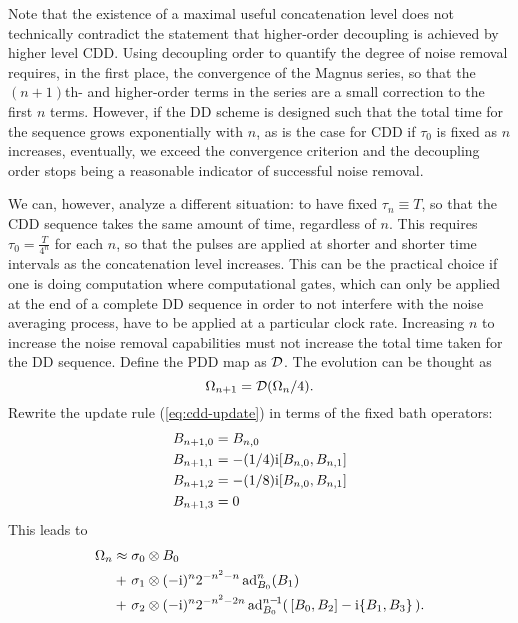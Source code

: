 \documentclass[pra,reprint,superscriptaddress]{revtex4-2}
\begin{document}
Note that the existence of a maximal useful concatenation level does not technically contradict the statement that 
higher-order decoupling is achieved by higher level CDD. Using decoupling order to quantify the degree of noise removal requires, in the first place, the convergence of the Magnus series, so that the $(n+1)$th- and higher-order terms in the series are a small correction to the first $n$ terms. However, if the DD scheme is designed such that the total time for the sequence grows exponentially with $n$, as is the case for CDD if $\tau_0$ is fixed as $n$ increases, eventually, we exceed the convergence criterion and the decoupling order stops being a reasonable indicator of successful noise removal. 

We can, however, analyze a different situation: to have fixed $\tau_n\equiv T$, so that the CDD sequence takes the same amount of time, regardless of $n$. This requires $\tau_0=\frac{T}{4^n}$ for each $n$, so that the pulses are applied at shorter and shorter time intervals as the concatenation level increases. This can be the practical choice if one is doing computation where computational gates, which can only be applied at the end of a complete DD sequence in order to not interfere with the noise averaging process, have to be applied at a particular clock rate. Increasing $n$ to increase the noise removal capabilities must not increase the total time taken for the DD sequence.
Define the PDD map as $\mathcal{D}$.
The evolution can be thought as 
\begin{equation}
 \Omega_{n+1} = \mathcal{D}(\Omega_{n}/4).
\end{equation}
Rewrite the update rule (\ref{eq:cdd-update}) in terms of the fixed bath operators:
\begin{equation}\label{eq:cdd-update2}
\begin{aligned}
 B_{n+1,0} &= B_{n,0}\\
B_{n+1,1} & = -(1/4)\mathrm{i} [B_{n,0}, B_{n,1} ]\\
 B_{n+1,2} & = -(1/8)\mathrm{i} [B_{n,0}, B_{n,1} ]\\
  B_{n+1,3} &=0
\end{aligned}
\end{equation}
This leads to 
\begin{align}\label{eq:cdd-generator-est2}
\Omega_{n} 
\approx {} & \sigma_0 \otimes B_0 \notag \\
+\ & \sigma_1 \otimes (-\mathrm{i})^{n} 2^{-n^2-n} \operatorname{ad}_{B_0}^{n}(B_1)\\ 
+\ & \sigma_2 \otimes (-\mathrm{i})^{n} 2^{-n^2-2n} \operatorname{ad}_{B_0}^{n-\!1}( \,[B_0,B_2] - \mathrm{i} \{B_1,B_3\} \,). \notag
\end{align} 
\end{document}
